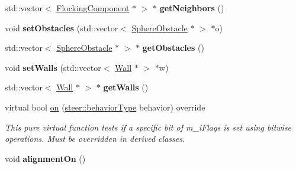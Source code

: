 \begin{DoxyCompactItemize}
\item 
\hypertarget{classsteer_1_1_flocking_component_ad019771bbd11d1149d374842e33425e5}{std\-::vector$<$ \hyperlink{classsteer_1_1_flocking_component}{Flocking\-Component} $\ast$ $>$ $\ast$ {\bfseries get\-Neighbors} ()}\label{classsteer_1_1_flocking_component_ad019771bbd11d1149d374842e33425e5}

\item 
\hypertarget{classsteer_1_1_flocking_component_ab7ad010eb626dec2d0784ddef972cc2a}{void {\bfseries set\-Obstacles} (std\-::vector$<$ \hyperlink{classsteer_1_1_sphere_obstacle}{Sphere\-Obstacle} $\ast$ $>$ $\ast$o)}\label{classsteer_1_1_flocking_component_ab7ad010eb626dec2d0784ddef972cc2a}

\item 
\hypertarget{classsteer_1_1_flocking_component_a7fbfd70dcb4055fa91df97c5dcfc3821}{std\-::vector$<$ \hyperlink{classsteer_1_1_sphere_obstacle}{Sphere\-Obstacle} $\ast$ $>$ $\ast$ {\bfseries get\-Obstacles} ()}\label{classsteer_1_1_flocking_component_a7fbfd70dcb4055fa91df97c5dcfc3821}

\item 
\hypertarget{classsteer_1_1_flocking_component_ae778656b1df44de398f81c8ec66f8766}{void {\bfseries set\-Walls} (std\-::vector$<$ \hyperlink{classsteer_1_1_wall}{Wall} $\ast$ $>$ $\ast$w)}\label{classsteer_1_1_flocking_component_ae778656b1df44de398f81c8ec66f8766}

\item 
\hypertarget{classsteer_1_1_flocking_component_ae6a60ac996d1ada0145e168f541a96ef}{std\-::vector$<$ \hyperlink{classsteer_1_1_wall}{Wall} $\ast$ $>$ $\ast$ {\bfseries get\-Walls} ()}\label{classsteer_1_1_flocking_component_ae6a60ac996d1ada0145e168f541a96ef}

\item 
virtual bool \hyperlink{classsteer_1_1_flocking_component_a0d788eaec845b83503a7918e984cfd5b}{on} (\hyperlink{namespacesteer_afe6e72f8f8088962727051501181acbe}{steer\-::behavior\-Type} behavior) override
\begin{DoxyCompactList}\small\item\em This pure virtual function tests if a specific bit of m\-\_\-i\-Flags is set using bitwise operations. Must be overridden in derived classes. \end{DoxyCompactList}\item 
\hypertarget{classsteer_1_1_flocking_component_a89ac69483994c9e64f3727029f70ec58}{void {\bfseries alignment\-On} ()}\label{classsteer_1_1_flocking_component_a89ac69483994c9e64f3727029f70ec58}


\end{DoxyCompactItemize}
